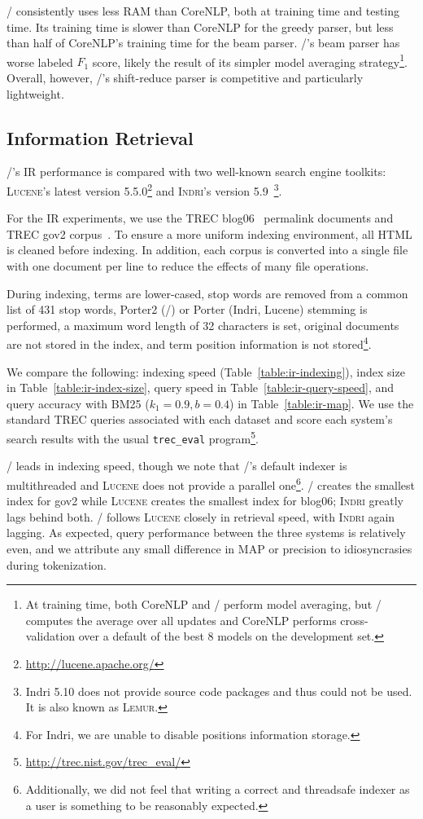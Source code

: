 \meta/ consistently uses less RAM than CoreNLP, both at training
time and testing time. Its training time is slower than CoreNLP
for the greedy parser, but less than half of CoreNLP's training time for
the beam parser. \meta/'s beam parser has worse labeled $F_1$ score, likely
the result of its simpler model averaging strategy\footnote{At training
time, both CoreNLP and \meta/ perform model averaging, but \meta/
computes the average over all updates and CoreNLP performs
cross-validation over a default of the best 8 models on the development
set.}. Overall, however, \meta/'s shift-reduce parser is competitive and
particularly lightweight.

\subsection{Information Retrieval}

\meta/'s IR performance is compared with two well-known search engine toolkits:
\textsc{Lucene}'s latest version 5.5.0\footnote{\url{http://lucene.apache.org/}} and
\textsc{Indri}'s version 5.9~\citep{lemur}\footnote{Indri 5.10 does not
provide source code packages and thus could not be used. It is also known
as \textsc{Lemur}.}.

For the IR experiments, we use the TREC blog06~\citep{blog06} permalink documents
and TREC gov2 corpus~\citep{gov2}. To ensure a more uniform indexing environment,
all HTML is cleaned before indexing. In addition, each corpus is converted into
a single file with one document per line to reduce the effects of many file
operations.

During indexing, terms are lower-cased, stop words are removed from a common
list of 431 stop words, Porter2 (\meta/) or Porter (Indri, Lucene) stemming is
performed, a maximum word length of 32 characters is set, original documents are
not stored in the index, and term position information is not
stored\footnote{For Indri, we are unable to disable positions information
storage.}.

We compare the following: indexing speed (Table~\ref{table:ir-indexing}), index
size in Table~\ref{table:ir-index-size}, query speed in
Table~\ref{table:ir-query-speed}, and query accuracy with BM25 ($k_1=0.9,
b=0.4$) in Table~\ref{table:ir-map}. We use the standard TREC queries associated
with each dataset and score each system's search results with the usual
\texttt{trec\_eval} program\footnote{\url{http://trec.nist.gov/trec_eval/}}.

\meta/ leads in indexing speed, though we note that \meta/'s default
indexer is multithreaded and \textsc{Lucene} does not provide a parallel
one\footnote{Additionally, we did not feel that writing a correct and threadsafe
indexer as a user is something to be reasonably expected.}. \meta/ creates the
smallest index for gov2 while \textsc{Lucene} creates the smallest index for
blog06; \textsc{Indri} greatly lags behind both. \meta/ follows \textsc{Lucene}
closely in retrieval speed, with \textsc{Indri} again lagging. As expected,
query performance between the three systems is relatively even, and we attribute
any small difference in MAP or precision to idiosyncrasies during tokenization.

